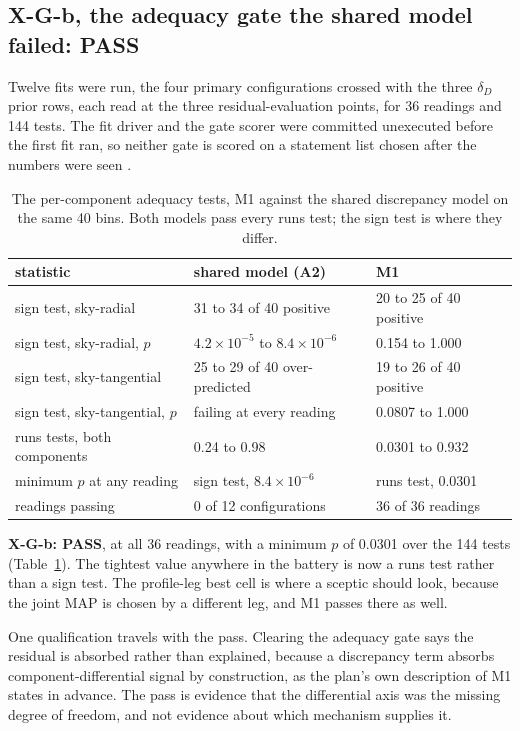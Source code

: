 \documentclass[11pt]{article}
\newcommand{\dD}{\ensuremath{\delta_D}}
\begin{document}
\subsection{X-G-b, the adequacy gate the shared model failed: PASS}
\label{sec:gates-b}

Twelve fits were run, the four primary configurations crossed with the three \dD{} prior rows, each read at the three residual-evaluation points, for 36 readings and 144 tests. The fit driver and the gate scorer were committed unexecuted before the first fit ran, so neither gate is scored on a statement list chosen after the numbers were seen \citep{AXIFitReport2026}.

\begin{table}[htbp]
\centering
\small
\caption{The per-component adequacy tests, M1 against the shared discrepancy model on the same 40 bins. Both models pass every runs test; the sign test is where they differ.}
\label{tab:xgb}
\begin{tabular}{lll}
\toprule
statistic & shared model (A2) & M1 \\
\midrule
sign test, sky-radial & 31 to 34 of 40 positive & 20 to 25 of 40 positive \\
sign test, sky-radial, $p$ & $4.2\times10^{-5}$ to $8.4\times10^{-6}$ & 0.154 to 1.000 \\
sign test, sky-tangential & 25 to 29 of 40 over-predicted & 19 to 26 of 40 positive \\
sign test, sky-tangential, $p$ & failing at every reading & 0.0807 to 1.000 \\
runs tests, both components & 0.24 to 0.98 & 0.0301 to 0.932 \\
minimum $p$ at any reading & sign test, $8.4\times10^{-6}$ & runs test, 0.0301 \\
readings passing & 0 of 12 configurations & 36 of 36 readings \\
\bottomrule
\end{tabular}
\end{table}

\textbf{X-G-b: PASS}, at all 36 readings, with a minimum $p$ of 0.0301 over the 144 tests (Table~\ref{tab:xgb}). The tightest value anywhere in the battery is now a runs test rather than a sign test. The profile-leg best cell is where a sceptic should look, because the joint MAP is chosen by a different leg, and M1 passes there as well.

One qualification travels with the pass. Clearing the adequacy gate says the residual is absorbed rather than explained, because a discrepancy term absorbs component-differential signal by construction, as the plan's own description of M1 states in advance. The pass is evidence that the differential axis was the missing degree of freedom, and not evidence about which mechanism supplies it.
\end{document}

